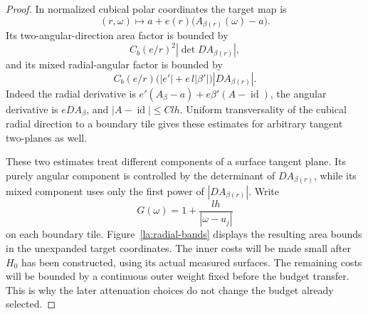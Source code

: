 \documentclass[11pt]{article}
\numberwithin{equation}{section}
\theoremstyle{definition}
\theoremstyle{remark}
\newcommand{\Id}{\operatorname{id}}
\begin{document}
\begin{proof}
In normalized cubical polar coordinates the target map is
\[
 (r,\omega)\longmapsto
       a+e(r)\bigl(A_{\beta(r)}(\omega)-a\bigr).
\]
Its two-angular-direction area factor is bounded by
\begin{equation}\label{la:two-angular}
 C_b(e/r)^2|\det DA_{\beta(r)}|,
\end{equation}
and its mixed radial-angular factor is bounded by
\begin{equation}\label{la:mixed-angular}
 C_b(e/r)\bigl(|e'|+e\,l|\beta'|\bigr)|DA_{\beta(r)}|.
\end{equation}
Indeed the radial derivative is
$e'(A_\beta-a)+e\beta'(A-\Id)$, the angular derivative is $eDA_\beta$,
and $|A-\Id|\le Clh$.  Uniform transversality of the cubical radial
direction to a boundary tile gives these estimates for arbitrary
tangent two-planes as well.

These two estimates treat different components of a surface tangent
plane.  Its purely angular component is controlled by the determinant
of $DA_{\beta(r)}$, while its mixed component uses only the first power
of $|DA_{\beta(r)}|$.  Write
\[
 G(\omega)=1+\frac{lh}{|\omega-u_j|}
\]
on each boundary tile.  Figure~\ref{la:radial-bands} displays the
resulting area bounds in the unexpanded target coordinates.  The inner
costs will be made small after $H_0$ has been constructed, using its
actual measured surfaces.  The remaining costs will be bounded by a
continuous outer weight fixed before the budget transfer.  This is why
the later attenuation choices do not change the budget already selected.


\end{proof}
\end{document}
